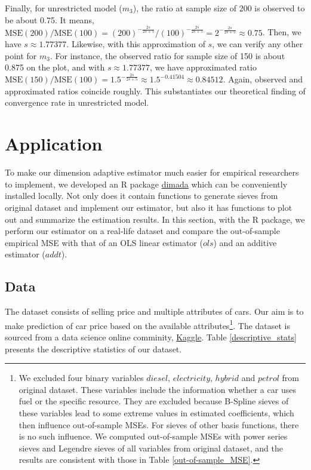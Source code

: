 \documentclass[12pt, a4paper]{article}
\theoremstyle{MAstyle} \newtheorem{assumption}{Assumption}[section]
\theoremstyle{MAstyle} \newtheorem{definition}{Definition}[section]
\theoremstyle{MAstyle} \newtheorem{theorem}{Theorem}[section]
\theoremstyle{MAstyle} \newtheorem{corollary}{Corollary}[section]
\begin{document}
                Finally, for unrestricted model ($m_3$), the ratio at sample size of 200 is observed to be about 0.75. It means, $\mathrm{MSE}(200)/\mathrm{MSE}(100)=(200)^{-\frac{2s}{2s+5}}/(100)^{-\frac{2s}{2s+5}}=2^{-\frac{2s}{2s+5}} \approx 0.75$. Then, we have $s \approx 1.77377$. Likewise, with this approximation of $s$, we can verify any other point for $m_3$. For instance, the observed ratio for sample size of 150 is about 0.875 on the plot, and with $s \approx 1.77377$, we have approximated ratio $\mathrm{MSE}(150)/\mathrm{MSE}(100)=1.5^{-\frac{2s}{2s+5}} \approx 1.5^{-0.41504} \approx 0.84512$. Again, observed and approximated ratios coincide roughly. This substantiates our theoretical finding of convergence rate in unrestricted model.

        \newpage
        
        \section{Application}\label{application}
            To make our dimension adaptive estimator much easier for empirical researchers to implement, we developed an R package \href{https://github.com/ccfang2/dimada}{dimada} which can be conveniently installed locally. Not only does it contain functions to generate sieves from original dataset and implement our estimator, but also it has functions to plot out and summarize the estimation results. In this section, with the R package, we perform our estimator on a real-life dataset and compare the out-of-sample empirical MSE with that of an OLS linear estimator ($ols$) and an additive estimator ($addt$).

            \subsection{Data}\label{data}
            The dataset consists of selling price and multiple attributes of cars. Our aim is to make prediction of car price based on the available attributes\footnote{We excluded four binary variables $diesel$, $electricity$, $hybrid$ and $petrol$ from original dataset. These variables include the information whether a car uses fuel or the specific resource. They are excluded because B-Spline sieves of these variables lead to some extreme values in estimated coefficients, which then influence out-of-sample MSEs. For sieves of other basis functions, there is no such influence. We computed out-of-sample MSEs with power series sieves and Legendre sieves of all variables from original dataset, and the results are consistent with those in Table \ref{out-of-sample_MSE}.}. The dataset is sourced from a data science online comminity, \href{https://www.kaggle.com/datasets/madhavmalhotra/car-price-regression-preprocessed}{Kaggle}. Table \ref{descriptive_stats} presents the descriptive statistics of our dataset.
\end{document}
